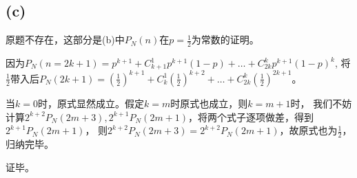 \documentclass[UTF8]{report}
\begin{document}
        \subsection*{(c)}
            原题不存在，这部分是(b)中$P_N(n)$在$p = \frac{1}{2}$为常数的证明。

            因为$P_N(n = 2k + 1) = p^{k + 1} + C_{k + 1}^1p^{k+1}(1 - p) + \dots + C_{2k}^kp^{k + 1}(1 - p)^k$,
            将$\frac{1}{2}$带入后$P_N(2k + 1) = (\frac{1}{2})^{k + 1} + C_k^1(\frac{1}{2})^{k + 2} + \dots + C_{2k}^k(\frac{1}{2})^{2k + 1}$。
            
            当$k = 0$时，原式显然成立。假定$k = m$时原式也成立，则$k = m + 1$时，
            我们不妨计算$2^{k+2}P_N(2m + 3), 2^{k + 1}P_N(2m + 1)$，将两个式子逐项做差，得到$2^{k + 1}P_N(2m + 1)$，
            则$2^{k+2}P_N(2m + 3) = 2^{k + 2}P_N(2m + 1)$，故原式也为$\frac{1}{2}$，归纳完毕。

            证毕。
\end{document}
